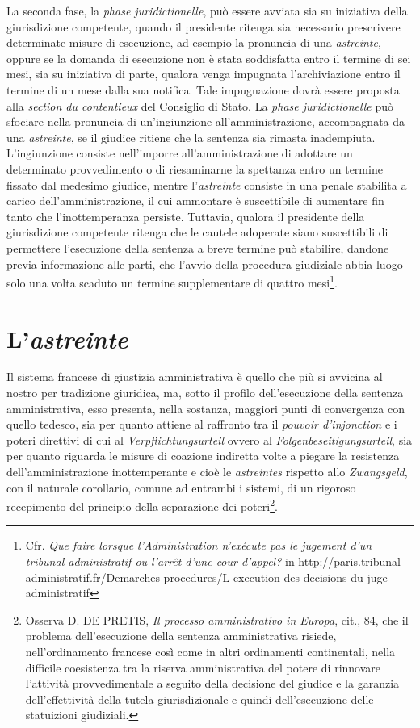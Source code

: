 \documentclass[12pt,it,a4paper,]{report}
\begin{document}
La seconda fase, la \emph{phase juridictionelle}, può essere avviata sia
su iniziativa della giurisdizione competente, quando il presidente
ritenga sia necessario prescrivere determinate misure di esecuzione, ad
esempio la pronuncia di una \emph{astreinte}, oppure se la domanda di
esecuzione non è stata soddisfatta entro il termine di sei mesi, sia su
iniziativa di parte, qualora venga impugnata l'archiviazione entro il
termine di un mese dalla sua notifica. Tale impugnazione dovrà essere
proposta alla \emph{section du contentieux} del Consiglio di Stato. La
\emph{phase juridictionelle} può sfociare nella pronuncia di
un'ingiunzione all'amministrazione, accompagnata da una
\emph{astreinte}, se il giudice ritiene che la sentenza sia rimasta
inadempiuta. L'ingiunzione consiste nell'imporre all'amministrazione di
adottare un determinato provvedimento o di riesaminarne la spettanza
entro un termine fissato dal medesimo giudice, mentre l'\emph{astreinte}
consiste in una penale stabilita a carico dell'amministrazione, il cui
ammontare è suscettibile di aumentare fin tanto che l'inottemperanza
persiste. Tuttavia, qualora il presidente della giurisdizione competente
ritenga che le cautele adoperate siano suscettibili di permettere
l'esecuzione della sentenza a breve termine può stabilire, dandone
previa informazione alle parti, che l'avvio della procedura giudiziale
abbia luogo solo una volta scaduto un termine supplementare di quattro
mesi\footnote{Cfr. \emph{Que faire lorsque l'Administration n'exécute
  pas le jugement d'un tribunal administratif ou l'arrêt d'une cour
  d'appel?} in
  http://paris.tribunal-administratif.fr/Demarches-procedures/L-execution-des-decisions-du-juge-administratif}.

\hypertarget{lastreinte}{%
\section{\texorpdfstring{L'\emph{astreinte}}{L'astreinte}}\label{lastreinte}}

Il sistema francese di giustizia amministrativa è quello che più si
avvicina al nostro per tradizione giuridica, ma, sotto il profilo
dell'esecuzione della sentenza amministrativa, esso presenta, nella
sostanza, maggiori punti di convergenza con quello tedesco, sia per
quanto attiene al raffronto tra il \emph{pouvoir d'injonction} e i
poteri direttivi di cui al \emph{Verpflichtungsurteil} ovvero al
\emph{Folgenbeseitigungsurteil}, sia per quanto riguarda le misure di
coazione indiretta volte a piegare la resistenza dell'amministrazione
inottemperante e cioè le \emph{astreintes} rispetto allo
\emph{Zwangsgeld}, con il naturale corollario, comune ad entrambi i
sistemi, di un rigoroso recepimento del principio della separazione dei
poteri\footnote{Osserva D. DE PRETIS, \emph{Il processo amministrativo
  in Europa}, cit., 84, che il problema dell'esecuzione della sentenza
  amministrativa risiede, nell'ordinamento francese così come in altri
  ordinamenti continentali, nella difficile coesistenza tra la riserva
  amministrativa del potere di rinnovare l'attività provvedimentale a
  seguito della decisione del giudice e la garanzia dell'effettività
  della tutela giurisdizionale e quindi dell'esecuzione delle
  statuizioni giudiziali.}.
\end{document}
